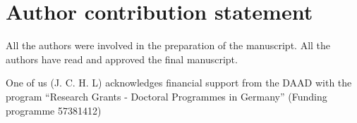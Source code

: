 \section{Author contribution statement}
All the authors were involved in the preparation of the manuscript.
All the authors have read and approved the final manuscript.

\begin{acknowledgement}
    One of us (J. C. H. L) acknowledges financial support from the DAAD with
    the program ``Research Grants - Doctoral Programmes in Germany''
    (Funding programme 57381412)
\end{acknowledgement}
